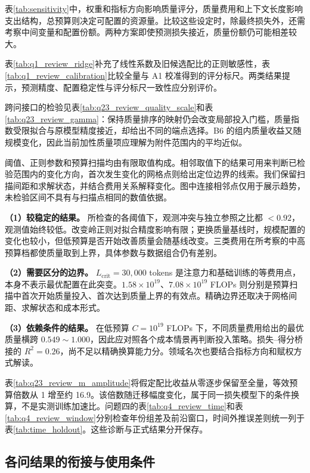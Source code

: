 表\ref{tab:sensitivity}中，权重和指标方向影响质量评分，质量费用和上下文长度影响支出结构，总预算则决定可配置的资源量。比较这些设定时，除最终损失外，还需考察中间变量和配置份额。两种方案即使预测损失接近，质量份额仍可能相差较大。

表\ref{tab:q1_review_ridge}补充了线性系数及旧候选配比的正则敏感性，表\ref{tab:q1_review_calibration}比较全量与 A1 校准得到的评分标尺。两类结果提示，预测精度、配置稳定性与评分标尺一致性应分别评价。

跨问接口的检验见表\ref{tab:q23_review_quality_scale}和表\ref{tab:q23_review_gamma}：保持质量排序的映射仍会改变局部投入门槛，质量指数受限拟合与原模型精度接近，却给出不同的端点选择。B6 的组内质量收益又随规模变化，因此当前加性质量项应理解为附件范围内的平均近似。

阈值、正则参数和预算扫描均由有限取值构成。相邻取值下的结果可用来判断已检验范围内的变化方向，首次发生变化的网格点则给出定位边界的线索。我们保留扫描间距和求解状态，并结合费用关系解释变化。图中连接相邻点仅用于展示趋势，未检验区间不具有与扫描点相同的数值依据。

\textbf{（1）较稳定的结果。} 所检查的各阈值下，观测冲突与独立参照之比都 $<0.92$，观测值始终较低。改变岭正则对拟合精度影响有限；更换质量基线时，规模配置的变化也较小，但低预算是否开始改善质量会随基线改变。三类费用在所考察的中高预算档都使质量取到上界，具体参数与数据组合仍有差别。

\textbf{（2）需要区分的边界。} $L_{\text{crit}}=30{,}000$ tokens 是注意力和基础训练的等费用点，本身不表示最优配置在此突变。$1.58\times10^{19}$、$7.08\times10^{19}$ FLOPs 则分别是预算扫描中首次开始质量投入、首次达到质量上界的有效点。精确边界还取决于网格间距、求解状态和成本形式。

\textbf{（3）依赖条件的结果。} 在低预算 $C=10^{19}$ FLOPs 下，不同质量费用给出的最优质量横跨 $0.549\sim1.000$，因此应对照各个成本情景再判断投入策略。损失--得分桥接的 $R^2=0.26$，尚不足以精确换算能力分。领域名次也要结合指标方向和赋权方式解读。

表\ref{tab:q23_review_m_amplitude}将假定配比收益从零逐步保留至全量，等效预算倍数从 1 增至约 16.9。该倍数随迁移幅度变化，属于同一损失模型下的条件换算，不是实测训练加速比。问题四的表\ref{tab:q4_review_time}和表\ref{tab:q4_review_window}分别检查年份组差及前沿窗口，时间外推误差则统一列于表\ref{tab:time_holdout}。这些诊断与正式结果分开保存。

\subsection{各问结果的衔接与使用条件}

